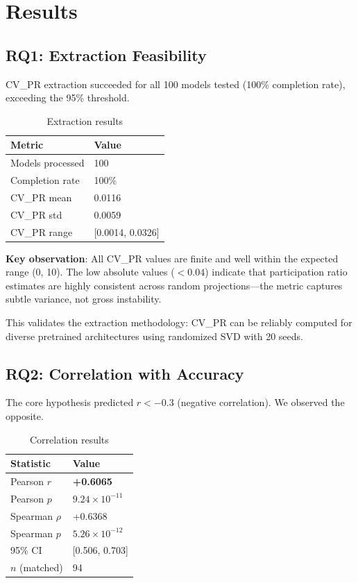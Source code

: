 \section{Results}
\label{sec:results}

\subsection{RQ1: Extraction Feasibility}

CV\_PR extraction succeeded for all 100 models tested (100\% completion rate), exceeding the 95\% threshold.

\begin{table}[h]
\centering
\caption{Extraction results}
\label{tab:extraction}
\begin{tabular}{ll}
\toprule
Metric & Value \\
\midrule
Models processed & 100 \\
Completion rate & 100\% \\
CV\_PR mean & 0.0116 \\
CV\_PR std & 0.0059 \\
CV\_PR range & [0.0014, 0.0326] \\
\bottomrule
\end{tabular}
\end{table}

\textbf{Key observation}: All CV\_PR values are finite and well within the expected range (0, 10). The low absolute values ($< 0.04$) indicate that participation ratio estimates are highly consistent across random projections---the metric captures subtle variance, not gross instability.

This validates the extraction methodology: CV\_PR can be reliably computed for diverse pretrained architectures using randomized SVD with 20 seeds.

\subsection{RQ2: Correlation with Accuracy}

The core hypothesis predicted $r < -0.3$ (negative correlation). We observed the opposite.

\begin{table}[h]
\centering
\caption{Correlation results}
\label{tab:correlation}
\begin{tabular}{ll}
\toprule
Statistic & Value \\
\midrule
Pearson $r$ & \textbf{+0.6065} \\
Pearson $p$ & $9.24 \times 10^{-11}$ \\
Spearman $\rho$ & +0.6368 \\
Spearman $p$ & $5.26 \times 10^{-12}$ \\
95\% CI & [0.506, 0.703] \\
$n$ (matched) & 94 \\
\bottomrule
\end{tabular}
\end{table}

